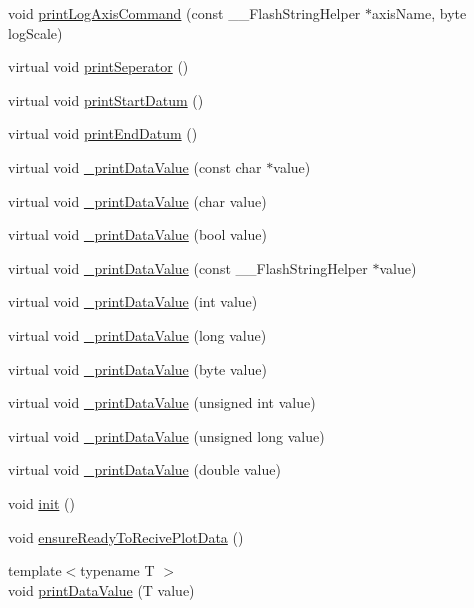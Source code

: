\begin{DoxyCompactItemize}
\item 
void \hyperlink{class_g_n_u_plot_base_ad7e8ef8d8e5eb80119fc0cce9be2d525}{print\+Log\+Axis\+Command} (const \+\_\+\+\_\+\+Flash\+String\+Helper $\ast$axis\+Name, byte log\+Scale)
\item 
virtual void \hyperlink{class_g_n_u_plot_base_ae204818b4e8dcd9d2f6b5426127ca2cf}{print\+Seperator} ()
\item 
virtual void \hyperlink{class_g_n_u_plot_base_ac2b48b822b6043392b514c9580b1661a}{print\+Start\+Datum} ()
\item 
virtual void \hyperlink{class_g_n_u_plot_base_aff02bc279e6c3cb83f2cdc7aa021268f}{print\+End\+Datum} ()
\item 
virtual void \hyperlink{class_g_n_u_plot_base_ad00a12fd681e4638fae005891fd72f38}{\+\_\+print\+Data\+Value} (const char $\ast$value)
\item 
virtual void \hyperlink{class_g_n_u_plot_base_aa6c6dfff0568dd99c0c28081c41b4433}{\+\_\+print\+Data\+Value} (char value)
\item 
virtual void \hyperlink{class_g_n_u_plot_base_a6f14fc040ff833c685ab09fc7917e059}{\+\_\+print\+Data\+Value} (bool value)
\item 
virtual void \hyperlink{class_serial_graph_a0c4d2c1239de3107d7332389183b05a1}{\+\_\+print\+Data\+Value} (const \+\_\+\+\_\+\+Flash\+String\+Helper $\ast$value)
\item 
virtual void \hyperlink{class_serial_graph_a58edf4683c600b6bfa1714b0f8dfc82c}{\+\_\+print\+Data\+Value} (int value)
\item 
virtual void \hyperlink{class_serial_graph_a9a4903d4fa26bb85ba5dd93c4365bcc2}{\+\_\+print\+Data\+Value} (long value)
\item 
virtual void \hyperlink{class_serial_graph_acada5333b96b65e31d8c76c3ab22905f}{\+\_\+print\+Data\+Value} (byte value)
\item 
virtual void \hyperlink{class_serial_graph_acd91cf0c3a0f49d4bdf18b447503da23}{\+\_\+print\+Data\+Value} (unsigned int value)
\item 
virtual void \hyperlink{class_serial_graph_a6dbfe61ee398e18c1b752a3748df9663}{\+\_\+print\+Data\+Value} (unsigned long value)
\item 
virtual void \hyperlink{class_serial_graph_a766d5838ede9c8fa998ce8664e5f92be}{\+\_\+print\+Data\+Value} (double value)
\item 
void \hyperlink{class_serial_graph_a760dd00474c9780c81ece7cdf621fc15}{init} ()
\item 
void \hyperlink{class_serial_graph_abd43150abedec26eef3994cd33035173}{ensure\+Ready\+To\+Recive\+Plot\+Data} ()
\item 
{\footnotesize template$<$typename T $>$ }\\void \hyperlink{class_serial_graph_a91e20c05c8cc612fd9ffd85880149264}{print\+Data\+Value} (T value)
\end{DoxyCompactItemize}

